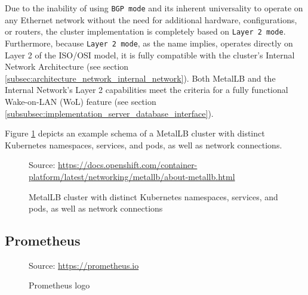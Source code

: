 Due to the inability of using \texttt{BGP mode} and its inherent universality to
operate on any Ethernet network without the need for additional hardware, configurations,
or routers, the cluster implementation is completely based on \texttt{Layer 2 mode}.
Furthermore, because \texttt{Layer 2 mode}, as the name implies, operates directly
on Layer 2 of the ISO/OSI model, it is fully compatible with the cluster's
Internal Network Architecture (see section \ref{subsec:architecture_network_internal_network}).
Both MetalLB and the Internal Network's Layer 2 capabilities meet the criteria for
a fully functional Wake-on-LAN (WoL) feature (see section
\ref{subsubsec:implementation_server_database_interface}).

Figure \ref{fig:metallb} depicts an example schema of a MetalLB cluster with distinct
Kubernetes namespaces, services, and pods, as well as network connections.

\begin{figure}[htbp]
  \centering
  \def\stackalignment{r} %
  {\scriptsize Source: \url{https://docs.openshift.com/container-platform/latest/networking/metallb/about-metallb.html} }
  \caption{MetalLB
  cluster
  with
  distinct
  Kubernetes
  namespaces,
  services,
  and
  pods,
  as
  well
  as
  network
  connections}
  \label{fig:metallb}
\end{figure}

\subsection{Prometheus}
\label{subsec:implementation_dependencies_prometheus}

\begin{figure} %
  \centering
  \def\stackalignment{l} %
  {\scriptsize \parbox[t]{\linewidth}{ Source: \url{https://prometheus.io}} }
  \caption{Prometheus logo}
\end{figure}

